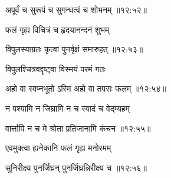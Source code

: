 
{\devanagarifont अपूर्वं च सुरूपं च सुगन्धत्वं च शोभनम् {॥१२:५२॥} \veg\dontdisplaylinenum }%

{\devanagarifont फलं गृह्य विचित्रं च हृदयानन्दनं शुभम् \thinspace{\dandab} \dontdisplaylinenum }%
 

{\devanagarifont विपुलस्याग्रतः कृत्वा पुनर्वृक्षं समारुहत् {॥१२:५३॥} \veg\dontdisplaylinenum }%

{\devanagarifont विपुलश्चित्रवद्दृष्ट्वा विस्मयं परमं गतः \thinspace{\dandab} \dontdisplaylinenum }%


{\devanagarifont अहो वा स्वप्नभूतो ऽस्मि अहो वा तपसः फलम् {॥१२:५४॥} \veg\dontdisplaylinenum }%

{\devanagarifont न पश्यामि न जिघ्रामि न च स्वादं च वेद्म्यहम् \thinspace{\dandab} \dontdisplaylinenum }%


{\devanagarifont वार्त्तापि न च मे श्रोता प्रतिजानामि कंचन {॥१२:५५॥} \veg\dontdisplaylinenum }%

{\devanagarifont एवमुक्त्वा ह्यनेकानि फलं गृह्य मनोरमम् \thinspace{\dandab} \dontdisplaylinenum }%


{\devanagarifont सुनिरीक्ष्य पुनर्जिघ्रन् पुनर्जिघ्रन्निरीक्ष्य च {॥१२:५६॥} \veg\dontdisplaylinenum }%

